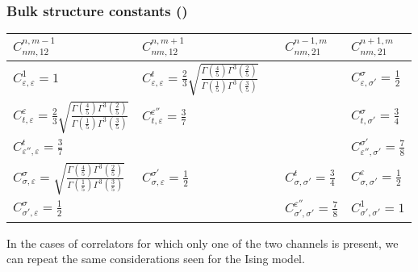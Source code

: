 \documentclass[a4paper,12pt]{report}
\begin{document}
\subsubsection{Bulk structure constants (\cite{TIMscaling})}
\begin{center}
\begin{tabular}{|l|l|l|l|l|}\hline
$ C_{nm,12}^{n,m-1}$  &  $ C_{nm,12}^{n,m+1}$ &&  $ C_{nm,21}^{n-1,m}$  &  $ C_{nm,21}^{n+1,m}$  \\ \hline

$ C_{\varepsilon,\varepsilon}^{1}=1$ & $ C_{\varepsilon,\varepsilon}^{t}=\frac{2}{3}\sqrt{\frac{\Gamma
\left(\frac{4}{5} \right)\Gamma
^{3}\left(\frac{2}{5} \right)}{\Gamma \left(\frac{1}{5} \right)\Gamma ^{3}\left(\frac{3}{5} \right)}}$ &&  & $ C_{\varepsilon,\sigma'}^{\sigma}=\frac{1}{2}$ \\

$ C_{t,\varepsilon}^{\varepsilon}=\frac{2}{3}\sqrt{\frac{\Gamma \left(\frac{4}{5} \right)\Gamma
^{3}\left(\frac{2}{5} \right)}{\Gamma \left(\frac{1}{5} \right)\Gamma ^{3}\left(\frac{3}{5} \right)}}$   &  $
C_{t,\varepsilon}^{\varepsilon''}=\frac{3}{7}$  &&     &  $ C_{t,\sigma'}^{\sigma}=\frac{3}{4}$    \\


$ C_{\varepsilon'',\varepsilon}^{t}=\frac{3}{7}$  &  &&    &  $ C_{\varepsilon'',\sigma'}^{\sigma'}=\frac{7}{8}$   \\

$ C_{\sigma,\varepsilon}^{\sigma}=\sqrt{\frac{\Gamma \left(\frac{4}{5} \right)\Gamma ^{3}\left(\frac{2}{5}
\right)}{\Gamma \left(\frac{1}{5} \right)\Gamma ^{3}\left(\frac{3}{5} \right)}}$  &  $
C_{\sigma,\varepsilon}^{\sigma'}=\frac{1}{2}$  && $ C_{\sigma,\sigma'}^{t}=\frac{3}{4}$  &  $ C_{\sigma,\sigma'}^{\varepsilon}=\frac{1}{2}$    \\

$ C_{\sigma',\varepsilon}^{\sigma}=\frac{1}{2}$ &  && $ C_{\sigma',\sigma'}^{\varepsilon''}=\frac{7}{8}$ &  $ C_{\sigma',\sigma'}^{1}=1$    \\
\hline
\end{tabular}
\end{center}

\vspace{1cm}

In the cases of correlators for which only one of the two channels is present, we can repeat the same
considerations seen for the Ising model.
\end{document}
